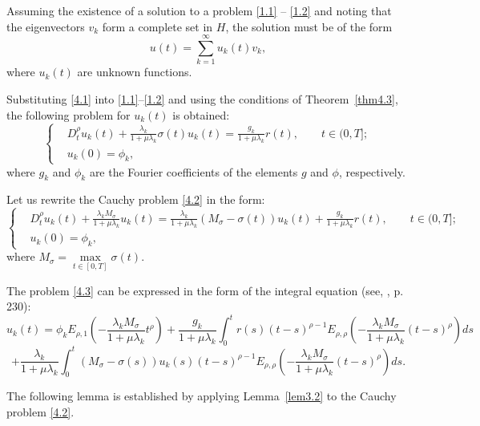 \documentclass[reqno]{amsart}
\theoremstyle{definition}
\numberwithin{equation}{section}
\begin{document}
Assuming the existence of a solution to a problem \eqref{1.1} – \eqref{1.2} and noting that the eigenvectors ${v_k}$ form a complete set in $H$, the solution must be of the form
\begin{equation}\label{4.1}
   u(t) = \sum_{k=1}^{\infty } u_{k}(t)v_{k}, 
\end{equation}
where $u_k(t)$ are unknown functions.

Substituting \eqref{4.1} into \eqref{1.1}–\eqref{1.2} and using the conditions of Theorem~\ref{thm4.3}, the following problem for $u_k(t)$ is obtained:
\begin{equation}\label{4.2}
\left\{
\begin{aligned}
    & D_{t}^{\rho }{{u}_{k}}(t)+\frac{{{\lambda }_{k}}}{1+ \mu{{\lambda }_{k}}}\sigma (t){{u}_{k}}(t)=\frac{{{g}_{k}}}{1+\mu{{\lambda }_{k}}}r(t), \qquad  t \in (0,T]; \\
    & u_{k}(0) = \phi_{k},
\end{aligned}
\right.
\end{equation}
where $g_k$ and $\phi_k$ are the Fourier coefficients of the elements $g$ and $\phi$, respectively.

Let us rewrite the Cauchy problem \eqref{4.2} in the form:
\begin{equation}\label{4.3}
\left\{
\begin{aligned}
    & D_t^\rho u_k(t)+\frac{\lambda_k M_\sigma}{1+\mu \lambda_k} u_k(t)=\frac{\lambda_k}{1+\mu \lambda_k}\left(M_\sigma-\sigma(t)\right) u_k(t)+\frac{g_k}{1+\mu \lambda_k} r(t), \qquad  t \in (0,T]; \\
    & u_{k}(0) = \phi_{k},
\end{aligned}
\right.
\end{equation}
where ${{M}_{\sigma }}= \underset{t\in [0,T]}{\max } \sigma (t)$.

The problem \eqref{4.3} can be expressed in the form of the integral equation (see, \cite{KilbasSrivstavaTrujillo}, p. 230):
$$
u_k(t)=\phi_k E_{\rho, 1}\left(-\frac{\lambda_k M_\sigma}{1+\mu \lambda_k} t^\rho\right)+\frac{g_k}{1+\mu \lambda_k} \int_0^t r(s)(t-s)^{\rho-1} E_{\rho, \rho}\left(-\frac{\lambda_k M_\sigma}{1+\mu \lambda_k}(t-s)^\rho\right) ds
$$
\begin{equation}\label{4.4}
+\frac{\lambda_k}{1+\mu \lambda_k} \int_0^t\left(M_\sigma-\sigma(s)\right) u_k(s)(t-s)^{\rho-1} E_{\rho, \rho}\left(-\frac{\lambda_k M_\sigma}{1+\mu \lambda_k}(t-s)^\rho\right)ds. 
\end{equation}

The following lemma is established by applying Lemma~\ref{lem3.2} to the Cauchy problem \eqref{4.2}.
\end{document}
